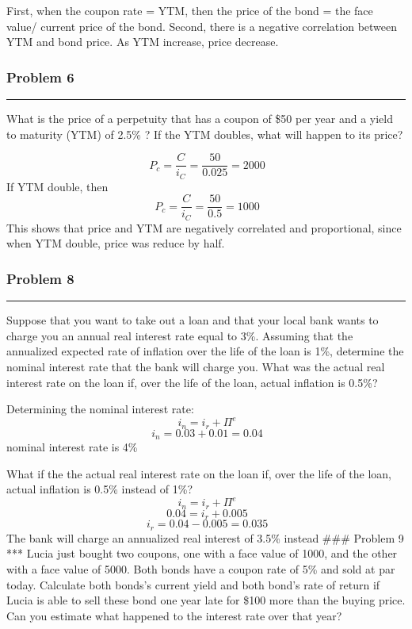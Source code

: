 \documentclass[
]{article}
\begin{document}
First, when the coupon rate = YTM, then the price of the bond = the face
value/ current price of the bond. Second, there is a negative
correlation between YTM and bond price. As YTM increase, price decrease.

\hypertarget{problem-6}{%
\subsubsection{Problem 6}\label{problem-6}}

\begin{center}\rule{0.5\linewidth}{\linethickness}\end{center}

What is the price of a perpetuity that has a coupon of \$50 per year and
a yield to maturity (YTM) of 2.5\% ? If the YTM doubles, what will
happen to its price?

\[\ P_c = \frac{C}{i_C} = \frac{50}{0.025} = 2000 \] If YTM double, then
\[\ P_c = \frac{C}{i_C} = \frac{50}{0.5} = 1000 \] This shows that price
and YTM are negatively correlated and proportional, since when YTM
double, price was reduce by half.

\hypertarget{problem-8}{%
\subsubsection{Problem 8}\label{problem-8}}

\begin{center}\rule{0.5\linewidth}{\linethickness}\end{center}

Suppose that you want to take out a loan and that your local bank wants
to charge you an annual real interest rate equal to 3\%. Assuming that
the annualized expected rate of inflation over the life of the loan is
1\%, determine the nominal interest rate that the bank will charge you.
What was the actual real interest rate on the loan if, over the life of
the loan, actual inflation is 0.5\%?

Determining the nominal interest rate: \[\ i_n = i_r + \Pi^{e} \]
\[\ i_n = 0.03 + 0.01 = 0.04 \] nominal interest rate is 4\%

What if the the actual real interest rate on the loan if, over the life
of the loan, actual inflation is 0.5\% instead of 1\%?
\[\ i_n = i_r + \Pi^{e} \] \[\ 0.04 = i_r + 0.005 \]
\[\ i_r = 0.04 - 0.005 = 0.035  \] The bank will charge an annualized
real interest of 3.5\% instead \#\#\# Problem 9 *** Lucia just bought
two coupons, one with a face value of 1000, and the other with a face
value of 5000. Both bonds have a coupon rate of 5\% and sold at par
today. Calculate both bonds's current yield and both bond's rate of
return if Lucia is able to sell these bond one year late for \$100 more
than the buying price. Can you estimate what happened to the interest
rate over that year?
\end{document}
